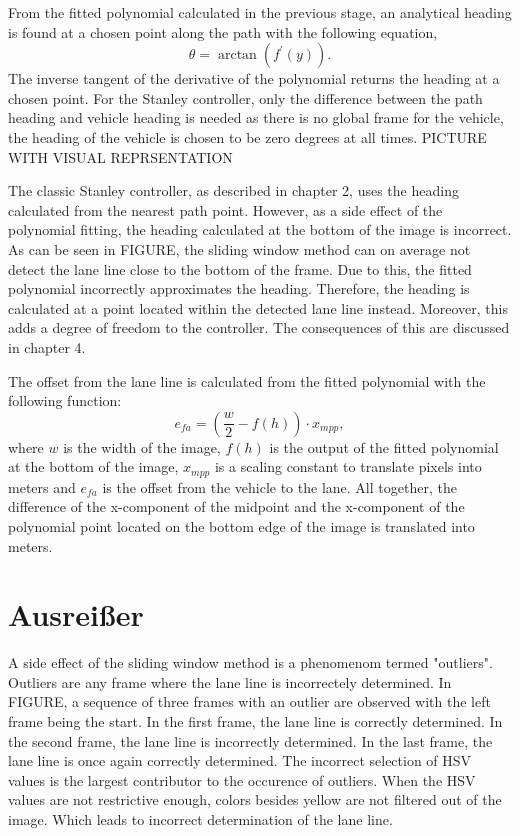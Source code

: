 \documentclass[arbeit=studie,oneside,BCOR=12mm]{ArbeitRST}
\begin{document}
From the fitted polynomial calculated in the previous stage, an analytical
heading is found at a chosen point along the path with the following equation,
\begin{equation}
  \theta = \arctan(f^\prime(y)).
\end{equation}
The inverse tangent of the derivative of
the polynomial returns the heading at a chosen point. For the Stanley
controller, only the difference between the path heading and vehicle heading
is needed as there is no global frame for the vehicle, the heading
of the vehicle is chosen to be zero degrees at all times. PICTURE WITH VISUAL
REPRSENTATION 

The classic Stanley controller, as described in chapter 2, uses the heading
calculated from the nearest path point. However, as a side effect of the
polynomial fitting, the heading calculated at the bottom of the image is
incorrect. As can be seen in FIGURE, the sliding window method can on average
not detect the lane line close to the bottom of the frame. Due to this, the
fitted polynomial incorrectly approximates the heading. Therefore, the heading
is calculated at a point located within the detected lane line instead.
Moreover, this adds a degree of freedom to the controller. The consequences of
this are discussed in chapter 4.


The offset from the lane line is calculated from the fitted polynomial with
the following function: $$e_{fa} = (\frac{w}{2} - f(h))\cdot x_{mpp},$$ where
$w$ is the width of the image, $f(h)$ is the output of the fitted polynomial
at the bottom of the image, $x_{mpp}$ is a scaling constant to translate
pixels into meters and $e_{fa}$ is the offset from the vehicle to the lane.
All together, the difference of the x-component of the midpoint and the
x-component of the polynomial point located on the bottom edge of the image is
translated into meters.

\section{Ausrei{\ss}er}

A side effect of the sliding window method is a phenomenom termed "outliers".
Outliers are any frame where the lane line is incorrectely determined. In
FIGURE, a sequence of three frames with an outlier are observed with the left
frame being the start. In the first frame, the lane line is correctly
determined. In the second frame, the lane line is incorrectly determined. In
the last frame, the lane line is once again correctly determined. The incorrect
selection of HSV values is the largest contributor to the occurence of
outliers. When the HSV values are not restrictive enough, colors besides yellow
are not filtered out of the image. Which leads to incorrect determination of
the lane line.
\end{document}
